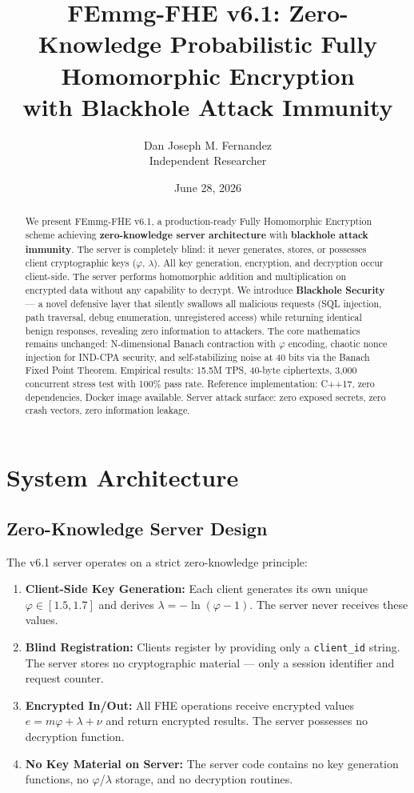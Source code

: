 \documentclass{article}
\title{FEmmg-FHE v6.1: Zero-Knowledge Probabilistic Fully Homomorphic Encryption\\with Blackhole Attack Immunity}
\author{Dan Joseph M. Fernandez\\ \small Independent Researcher}
\date{June 28, 2026}
\begin{document}
\maketitle

\begin{abstract}
We present FEmmg-FHE v6.1, a production-ready Fully Homomorphic Encryption scheme achieving \textbf{zero-knowledge server architecture} with \textbf{blackhole attack immunity}. The server is completely blind: it never generates, stores, or possesses client cryptographic keys ($\varphi$, $\lambda$). All key generation, encryption, and decryption occur client-side. The server performs homomorphic addition and multiplication on encrypted data without any capability to decrypt. We introduce \textbf{Blackhole Security} — a novel defensive layer that silently swallows all malicious requests (SQL injection, path traversal, debug enumeration, unregistered access) while returning identical benign responses, revealing zero information to attackers. The core mathematics remains unchanged: N-dimensional Banach contraction with $\varphi$ encoding, chaotic nonce injection for IND-CPA security, and self-stabilizing noise at 40 bits via the Banach Fixed Point Theorem. Empirical results: 15.5M TPS, 40-byte ciphertexts, 3,000 concurrent stress test with 100\% pass rate. Reference implementation: C++17, zero dependencies, Docker image available. Server attack surface: zero exposed secrets, zero crash vectors, zero information leakage.
\end{abstract}

\section{System Architecture}

\subsection{Zero-Knowledge Server Design}

The v6.1 server operates on a strict zero-knowledge principle:

\begin{enumerate}
    \item \textbf{Client-Side Key Generation:} Each client generates its own unique $\varphi \in [1.5, 1.7]$ and derives $\lambda = -\ln(\varphi - 1)$. The server never receives these values.
    
    \item \textbf{Blind Registration:} Clients register by providing only a \texttt{client\_id} string. The server stores no cryptographic material — only a session identifier and request counter.
    
    \item \textbf{Encrypted In/Out:} All FHE operations receive encrypted values $e = m\varphi + \lambda + \nu$ and return encrypted results. The server possesses no decryption function.
    
    \item \textbf{No Key Material on Server:} The server code contains no key generation functions, no $\varphi$/$\lambda$ storage, and no decryption routines.
\end{enumerate}
\end{document}
